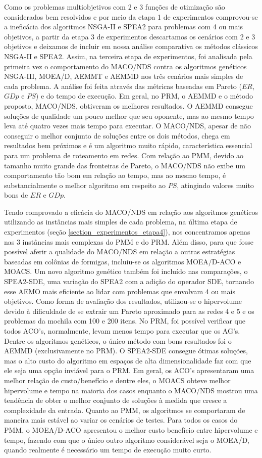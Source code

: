 Como os problemas multiobjetivos com 2 e 3 funções de otimização são considerados bem resolvidos e por meio da etapa 1 de experimentos comprovou-se a ineficácia dos algoritmos NSGA-II e SPEA2 para problemas com 4 ou mais objetivos, a partir da etapa 3 de experimentos descartamos os cenários com 2 e 3 objetivos e deixamos de incluir em nossa análise comparativa os métodos clássicos NSGA-II e SPEA2. Assim, na terceira etapa de experimentos, foi analisada pela primeira vez o comportamento do MACO/NDS contra os algoritmos genéticos NSGA-III, MOEA/D, AEMMT e AEMMD nos três cenários mais simples de cada problema. A análise foi feita através das métricas baseadas em Pareto ($ER$, $GDp$ e $PS$) e do tempo de execução. Em geral, no PRM, o AEMMD e o método proposto, MACO/NDS, obtiveram os melhores resultados. O AEMMD consegue soluções de qualidade um pouco melhor que seu oponente, mas ao mesmo tempo leva até quatro vezes mais tempo para executar. O MACO/NDS, apesar de não conseguir o melhor conjunto de soluções entre os dois métodos, chega em resultados bem próximos e é um algoritmo muito rápido, característica essencial para um problema de roteamento em redes. Com relação ao PMM, devido ao tamanho muito grande das fronteiras de Pareto, o MACO/NDS não exibe um comportamento tão bom em relação ao tempo, mas ao mesmo tempo, é substancialmente o melhor algoritmo em respeito ao $PS$, atingindo valores muito bons de $ER$ e $GDp$.

Tendo comprovado a eficácia do MACO/NDS em relação aos algoritmos genéticos utilizando as instâncias mais simples de cada problema, na última etapa de experimentos (seção \ref{section_experimentos_etapa4}), nos concentramos apenas nas 3 instâncias mais complexas do PMM e do PRM. Além disso, para que fosse possível aferir a qualidade do MACO/NDS em relação a outras estratégias baseadas em colônias de formigas, incluiu-se os algoritmos MOEA/D-ACO e MOACS. Um novo algoritmo genético também foi incluído nas comparações, o SPEA2-SDE, uma variação do SPEA2 com a adição do operador SDE, tornando esse AEMO mais eficiente ao lidar com problemas que envolvam 4 ou mais objetivos. Como forma de avaliação dos resultados, utilizou-se o hipervolume devido à dificuldade de se extrair um Pareto aproximado para as redes 4 e 5 e os problemas da mochila com 100 e 200 itens. No PRM, foi possível verificar que todos ACO's, normalmente, levam menos tempo para executar que os AG's. Dentre os algoritmos genéticos, o único método com bons resultados foi o AEMMD (exclusivamente no PRM). O SPEA2-SDE consegue ótimas soluções, mas o alto custo do algoritmo em espaços de alta dimensionalidade faz com que ele seja uma opção inviável para o PRM. Em geral, os ACO's apresentaram uma melhor relação de custo/benefício e dentre eles, o MOACS obteve melhor hipervolume e tempo na maioria dos casos enquanto o MACO/NDS mostrou uma tendência de obter o melhor conjunto de soluções à medida que cresce a complexidade da entrada. Quanto ao PMM, os algoritmos se comportaram de maneira mais estável ao variar os cenários de testes. Para todos os casos do PMM, o MOEA/D-ACO apresentou o melhor custo benefício entre hipervolume e tempo, fazendo com que o único outro algoritmo considerável seja o MOEA/D, quando realmente é necessário um tempo de execução muito curto.

